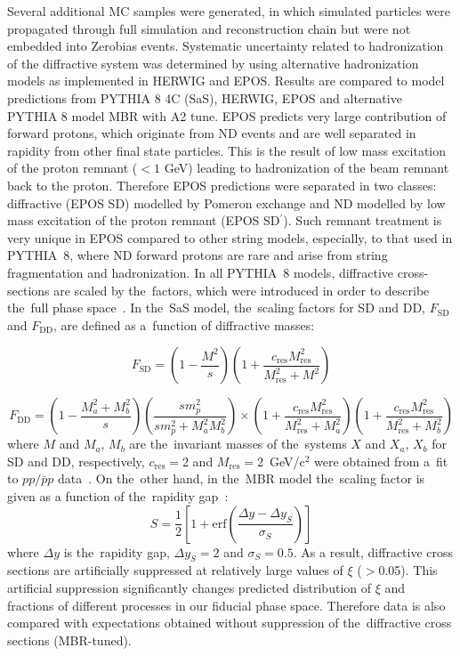 Several additional MC samples were generated, in which simulated particles were propagated  through full simulation and reconstruction chain but were not embedded into Zerobias events. Systematic uncertainty related to hadronization of the diffractive system was determined by using alternative hadronization models as implemented in HERWIG and EPOS.  
Results are compared to model predictions from PYTHIA 8 4C (\ac{SaS}), HERWIG, EPOS and alternative PYTHIA 8 model  \ac{MBR}  with A2 tune. EPOS predicts very large contribution of forward 
protons, which originate from \ac{ND} events and are well separated in rapidity from other final state particles. This is the result of low mass excitation of the proton remnant ($<1$ GeV) leading to hadronization of the beam remnant back to the proton. Therefore EPOS predictions were separated in two classes: diffractive (EPOS SD) modelled by Pomeron exchange and \ac{ND} modelled  by low mass excitation of the proton remnant (EPOS SD$^\prime$). Such remnant treatment is very unique in EPOS compared to other string models, especially, to that used in PYTHIA~8, where ND forward protons are rare 
and  arise from string fragmentation and hadronization. In all PYTHIA~8 models, diffractive cross-sections are scaled by the~factors, which were introduced in order to describe the~full phase space~\cite{Sjostrand:2006za,MBR:intro}. In the~\ac{SaS} model, the~scaling factors for SD and DD,  $F_{\textrm{SD}}$ and $F_{\textrm{DD}}$, are defined as a~function of diffractive masses:

\begin{equation}
F_{\textrm{SD}}=\left(1-\frac{M^2}{s}\right)\left(1+\frac{c_\textrm{res}M^2_\textrm{res}}{M^2_\textrm{res}+M^2}\right)
\end{equation}

\begin{equation}
F_{\textrm{DD}}=\left(1-\frac{M_a^2+M_b^2}{s}\right)\left(\frac{sm^2_p}{sm^2_p+M_a^2M_b^2}\right)\times
\left(1+\frac{c_\textrm{res}M_\textrm{res}^2}{M_\textrm{res}^2+M_a^2}\right)\left(1+\frac{c_\textrm{res}M_\textrm{res}^2}{M_\textrm{res}^2+M_b^2}\right)
\end{equation}
where $M$ and $M_{a}$, $M_{b}$ are the~invariant masses of the~systems $X$ and $X_a$, $X_b$ for SD and DD, respectively, $c_\textrm{res}=2$ and $M_\textrm{res}=2$~GeV/c$^2$ were obtained from a~fit to $pp/\bar{p}p$ data~\cite{Sjostrand:2006za}. On the~other hand, in the~\ac{MBR} model the~scaling factor is given as a function of the~rapidity gap~\cite{MBR:intro}:
\begin{equation}
S=\frac{1}{2}\left[1+\textrm{erf}\left(\frac{\Delta y-\Delta y_S}{\sigma_S}\right)\right]
\end{equation}
where $\Delta y$ is the~rapidity gap, $\Delta y_S=2$ and $\sigma_S=0.5$. As a result, diffractive cross sections are artificially suppressed at 
relatively large values of $\xi$ ($>$0.05). This artificial suppression significantly changes predicted distribution of $\xi$ and fractions of different processes in our fiducial phase space. Therefore data is also compared with expectations obtained without suppression of the~diffractive cross sections (MBR-tuned).

